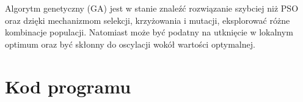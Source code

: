 \documentclass{article}
\begin{document}
Algorytm genetyczny (GA) jest w stanie znaleźć rozwiązanie szybciej niż PSO oraz
dzięki mechanizmom selekcji, krzyżowania i mutacji, eksplorować 
różne kombinacje populacji. Natomiast może być podatny na utknięcie w lokalnym
optimum oraz być skłonny do oscylacji wokół wartości optymalnej.



\section{Kod programu}


\end{document}
